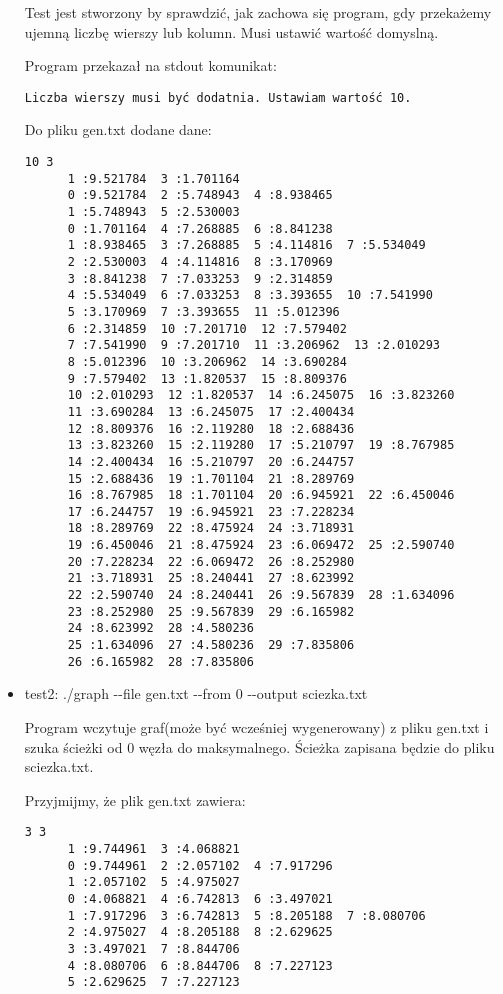 \documentclass[]{article}
\begin{document}
\begin{itemize}
Test jest stworzony by sprawdzić, jak zachowa się program, gdy przekażemy ujemną liczbę wierszy lub kolumn. Musi ustawić wartość domyslną.

Program przekazał na stdout komunikat:
\begin{verbatim}
Liczba wierszy musi być dodatnia. Ustawiam wartość 10.
\end{verbatim}

Do pliku gen.txt dodane dane:
\begin{verbatim}
10 3
	  1 :9.521784  3 :1.701164
	  0 :9.521784  2 :5.748943  4 :8.938465
	  1 :5.748943  5 :2.530003
	  0 :1.701164  4 :7.268885  6 :8.841238
	  1 :8.938465  3 :7.268885  5 :4.114816  7 :5.534049
	  2 :2.530003  4 :4.114816  8 :3.170969
	  3 :8.841238  7 :7.033253  9 :2.314859
	  4 :5.534049  6 :7.033253  8 :3.393655  10 :7.541990
	  5 :3.170969  7 :3.393655  11 :5.012396
	  6 :2.314859  10 :7.201710  12 :7.579402
	  7 :7.541990  9 :7.201710  11 :3.206962  13 :2.010293
	  8 :5.012396  10 :3.206962  14 :3.690284
	  9 :7.579402  13 :1.820537  15 :8.809376
	  10 :2.010293  12 :1.820537  14 :6.245075  16 :3.823260
	  11 :3.690284  13 :6.245075  17 :2.400434
	  12 :8.809376  16 :2.119280  18 :2.688436
	  13 :3.823260  15 :2.119280  17 :5.210797  19 :8.767985
	  14 :2.400434  16 :5.210797  20 :6.244757
	  15 :2.688436  19 :1.701104  21 :8.289769
	  16 :8.767985  18 :1.701104  20 :6.945921  22 :6.450046
	  17 :6.244757  19 :6.945921  23 :7.228234
	  18 :8.289769  22 :8.475924  24 :3.718931
	  19 :6.450046  21 :8.475924  23 :6.069472  25 :2.590740
	  20 :7.228234  22 :6.069472  26 :8.252980
	  21 :3.718931  25 :8.240441  27 :8.623992
	  22 :2.590740  24 :8.240441  26 :9.567839  28 :1.634096
	  23 :8.252980  25 :9.567839  29 :6.165982
	  24 :8.623992  28 :4.580236
	  25 :1.634096  27 :4.580236  29 :7.835806
	  26 :6.165982  28 :7.835806
\end{verbatim}

\item test2: ./graph -{}-file gen.txt -{}-from 0 -{}-output sciezka.txt

Program wczytuje graf(może być wcześniej wygenerowany) z pliku gen.txt i szuka ścieżki od 0 węzła do maksymalnego. Ścieżka zapisana będzie do pliku sciezka.txt.

Przyjmijmy, że plik gen.txt zawiera:
\begin{verbatim}
3 3
	  1 :9.744961  3 :4.068821
	  0 :9.744961  2 :2.057102  4 :7.917296
	  1 :2.057102  5 :4.975027
	  0 :4.068821  4 :6.742813  6 :3.497021
	  1 :7.917296  3 :6.742813  5 :8.205188  7 :8.080706
	  2 :4.975027  4 :8.205188  8 :2.629625
	  3 :3.497021  7 :8.844706
	  4 :8.080706  6 :8.844706  8 :7.227123
	  5 :2.629625  7 :7.227123
\end{verbatim}


\end{itemize}
\end{document}
